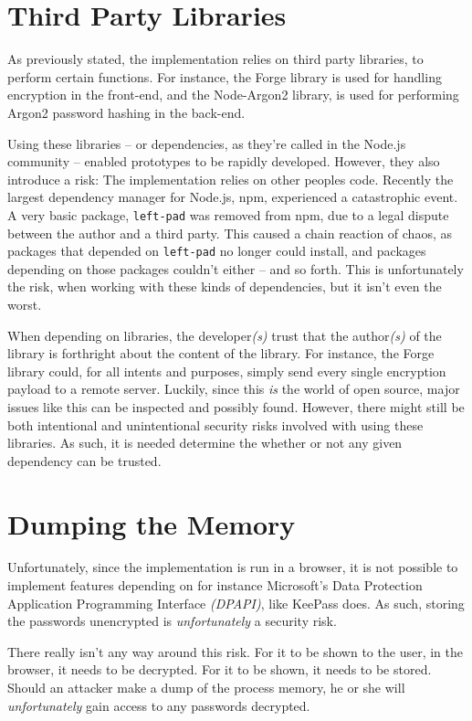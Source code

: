 	\section{Third Party Libraries}
		As previously stated, the implementation relies on third party libraries, to perform certain functions. For instance, the Forge library is used for handling encryption in the front-end, and the Node-Argon2 library, is used for performing Argon2 password hashing in the back-end. 

		Using these libraries -- or dependencies, as they're called in the Node.js community -- enabled prototypes to be rapidly developed. However, they also introduce a risk: The implementation relies on other peoples code. Recently the largest dependency manager for Node.js, npm, experienced a catastrophic event. A very basic package, \verb=left-pad= was removed from npm, due to a legal dispute between the author and a third party\cite{npm_leftpad}. This caused a chain reaction of chaos, as packages that depended on \verb=left-pad= no longer could install, and packages depending on those packages couldn't either -- and so forth. This is unfortunately the risk, when working with these kinds of dependencies, but it isn't even the worst.

		When depending on libraries, the developer\emph{(s)} trust that the author\emph{(s)} of the library is forthright about the content of the library. For instance, the Forge library could, for all intents and purposes, simply send every single encryption payload to a remote server. Luckily, since this \emph{is} the world of open source, major issues like this can be inspected and possibly found. However, there might still be both intentional and unintentional security risks involved with using these libraries. As such, it is needed determine the whether or not any given dependency can be trusted.

	\section{Dumping the Memory}
		Unfortunately, since the implementation is run in a browser, it is not possible to implement features depending on for instance Microsoft's Data Protection Application Programming Interface \emph{(DPAPI)}, like KeePass does. As such, storing the passwords unencrypted is \emph{unfortunately} a security risk.

		There really isn't any way around this risk. For it to be shown to the user, in the browser, it needs to be decrypted. For it to be shown, it needs to be stored. Should an attacker make a dump of the process memory, he or she will \emph{unfortunately} gain access to any passwords decrypted. 

